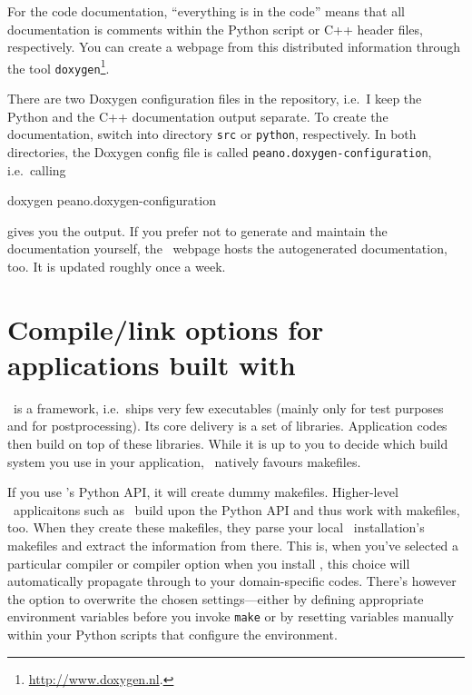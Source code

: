 \noindent
For the code documentation, ``everything is in the code'' means that all
documentation is comments within the Python script or C++ header files,
respectively.
You can create a webpage from this distributed information through
the tool \texttt{doxygen}\footnote{\url{http://www.doxygen.nl}.}. 


There are two Doxygen configuration files in the repository, i.e.~I keep the
Python and the C++ documentation output separate.
To create the documentation, switch into directory \texttt{src} or
\texttt{python}, respectively. 
In both directories, the Doxygen config file is called
\texttt{peano.doxygen-configuration}, i.e.~calling

\begin{code}
doxygen peano.doxygen-configuration
\end{code}

\noindent
gives you the output. If you prefer not to generate and maintain the
documentation yourself, the \Peano\ webpage hosts the autogenerated
documentation, too.
It is updated roughly once a week.



\section{Compile/link options for applications built with \Peano}
\label{section:installation:applications-built-with-Peano}

\Peano\ is a framework, i.e.~ships very few executables (mainly only for test
purposes and for postprocessing).
Its core delivery is a set of libraries.
Application codes then build on top of these libraries.
While it is up to you to decide which build system you use in your application,
\Peano\ natively favours makefiles.


If you use \Peano's Python API, it will create dummy makefiles.
Higher-level \Peano\ applicaitons such as \ExaHyPE\ build upon the Python API
and thus work with makefiles, too.
When they create these makefiles, they parse your local \Peano\ installation's
makefiles and extract the information from there.
This is, when you've selected a particular compiler or compiler option when you
install \Peano, this choice will automatically propagate through to your
domain-specific codes.
There's however the option to overwrite the chosen settings---either by defining
appropriate environment variables before you invoke \texttt{make} or by
resetting variables manually within your Python scripts that configure the
environment.



